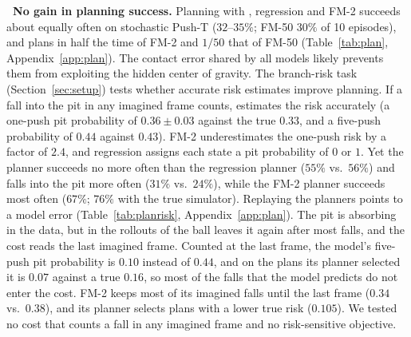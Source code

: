 \leavevmode{}\textbf{\thesubsection\ No gain in planning success.}
\label{sec:planning}
Planning with \imlewm{}, regression and FM-2 succeeds about equally often on stochastic Push-T ($32$--$35\%$; FM-50 $30\%$ of 10 episodes), and \imlewm{} plans in half the time of FM-2 and $1/50$ that of FM-50 (Table~\ref{tab:plan}, Appendix~\ref{app:plan}). The contact error shared by all models likely prevents them from exploiting the hidden center of gravity. The branch-risk task (Section~\ref{sec:setup}) tests whether accurate risk estimates improve planning. If a fall into the pit in any imagined frame counts, \imlewm{} estimates the risk accurately (a one-push pit probability of $0.36 \pm 0.03$ against the true $0.33$, and a five-push probability of $0.44$ against $0.43$). FM-2 underestimates the one-push risk by a factor of $2.4$, and regression assigns each state a pit probability of $0$ or $1$. Yet the \imlewm{} planner succeeds no more often than the regression planner ($55\%$ vs.\ $56\%$) and falls into the pit more often ($31\%$ vs.\ $24\%$), while the FM-2 planner succeeds most often ($67\%$; $76\%$ with the true simulator). Replaying the planners points to a model error (Table~\ref{tab:planrisk}, Appendix~\ref{app:plan}). The pit is absorbing in the data, but in the rollouts of \imlewm{} the ball leaves it again after most falls, and the cost reads the last imagined frame. Counted at the last frame, the model's five-push pit probability is $0.10$ instead of $0.44$, and on the plans its planner selected it is $0.07$ against a true $0.16$, so most of the falls that the model predicts do not enter the cost. FM-2 keeps most of its imagined falls until the last frame ($0.34$ vs.\ $0.38$), and its planner selects plans with a lower true risk ($0.105$). We tested no cost that counts a fall in any imagined frame and no risk-sensitive objective.
